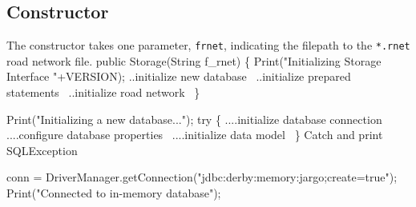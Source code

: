 \documentclass{article}
\def\nwendcode{\endtrivlist \endgroup}
\let\nwdocspar=\par
\theoremstyle{definition}
\begin{document}
\subsection{Constructor}
\label{sec:constructor}
The constructor takes one parameter, {\tt{}f{}rnet}, indicating the filepath to the
{\tt{}*.rnet} road network file.
\nwenddocs{}\endmoddef{}
public Storage(String f_rnet) \{
  Print("Initializing Storage Interface "+VERSION);
  \LA{}..initialize new database~{\nwtagstyle{}}\RA{}
  \LA{}..initialize prepared statements~{\nwtagstyle{}}\RA{}
  \LA{}..initialize road network~{\nwtagstyle{}}\RA{}
\}
\nwendcode{}\nwdocspar
\nwenddocs{}\endmoddef{}
Print("Initializing a new database...");
try \{
  \LA{}....initialize database connection~{\nwtagstyle{}}\RA{}
  \LA{}....configure database properties~{\nwtagstyle{}}\RA{}
  \LA{}....initialize data model~{\nwtagstyle{}}\RA{}
\}
\LA{}Catch and print \code{}SQLException\edoc{}~{\nwtagstyle{}}\RA{}
\nwendcode{}\nwdocspar
\nwenddocs{}\endmoddef{}
conn = DriverManager.getConnection("jdbc:derby:memory:jargo;create=true");
Print("Connected to in-memory database");
\nwendcode{}\nwdocspar
\end{document}
